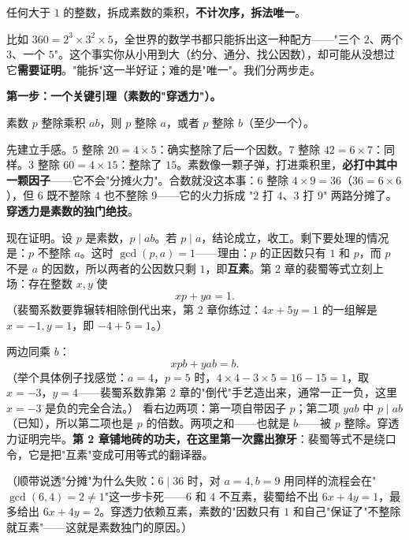 \begin{dingli}[算术基本定理]
任何大于 $1$ 的整数，拆成素数的乘积，\textbf{不计次序，拆法唯一}。
\end{dingli}

比如 $360 = 2^3 \times 3^2 \times 5$，全世界的数学书都只能拆出这一种配方——"三个 $2$、两个 $3$、一个 $5$"。这个事实你从小用到大（约分、通分、找公因数），却可能从没想过它\textbf{需要证明}。"能拆"这一半好证；难的是"唯一"。我们分两步走。

\textbf{第一步：一个关键引理（素数的"穿透力"）。}

\begin{yinli}[欧几里得引理]
素数 $p$ 整除乘积 $ab$，则 $p$ 整除 $a$，或者 $p$ 整除 $b$（至少一个）。
\end{yinli}

先建立手感。$5$ 整除 $20 = 4\times 5$：确实整除了后一个因数。$7$ 整除 $42 = 6\times 7$：同样。$3$ 整除 $60 = 4 \times 15$：整除了 $15$。素数像一颗子弹，打进乘积里，\textbf{必打中其中一颗因子}——它不会"分摊火力"。合数就没这本事：$6$ 整除 $4\times 9 = 36$（$36 = 6\times 6$），但 $6$ 既不整除 $4$ 也不整除 $9$——它的火力拆成 "$2$ 打 $4$、$3$ 打 $9$" 两路分摊了。\textbf{穿透力是素数的独门绝技}。

现在证明。设 $p$ 是素数，$p \mid ab$。若 $p \mid a$，结论成立，收工。剩下要处理的情况是：$p$ 不整除 $a$。这时 $\gcd(p, a) = 1$——理由：$p$ 的正因数只有 $1$ 和 $p$，而 $p$ 不是 $a$ 的因数，所以两者的公因数只剩 $1$，即\textbf{互素}。第 2 章的裴蜀等式立刻上场：存在整数 $x, y$ 使
\[
xp + ya = 1 .
\]
（裴蜀系数要靠辗转相除倒代出来，第 2 章你练过：$4x + 5y = 1$ 的一组解是 $x = -1, y = 1$，即 $-4 + 5 = 1$。）

两边同乘 $b$：
\[
xpb + yab = b .
\]
（举个具体例子找感觉：$a = 4$，$p = 5$ 时，$4\times4 - 3\times5 = 16 - 15 = 1$，取 $x = -3$，$y = 4$——裴蜀系数靠第 2 章的"倒代"手艺造出来，通常一正一负，这里 $x = -3$ 是负的完全合法。）
看右边两项：第一项自带因子 $p$；第二项 $yab$ 中 $p \mid ab$（已知），所以第二项也是 $p$ 的倍数。两项之和——也就是 $b$——被 $p$ 整除。穿透力证明完毕。\textbf{第 2 章铺地砖的功夫，在这里第一次露出獠牙}：裴蜀等式不是绕口令，它是把"互素"变成可用等式的翻译器。

（顺带说透"分摊"为什么失败：$6 \mid 36$ 时，对 $a=4, b=9$ 用同样的流程会在"$\gcd(6,4)=2 \ne 1$"这一步卡死——$6$ 和 $4$ 不互素，裴蜀给不出 $6x + 4y = 1$，最多给出 $6x + 4y = 2$。穿透力依赖互素，素数的"因数只有 $1$ 和自己"保证了"不整除就互素"——这就是素数独门的原因。）


